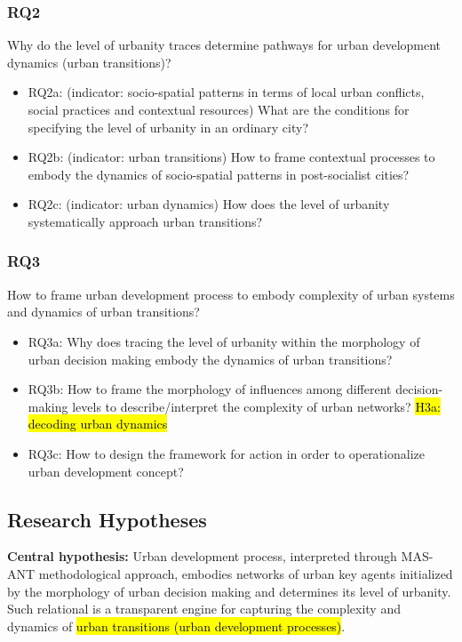 \documentclass[11pt]{report}
\begin{document}
\subsubsection{RQ2}
Why do the level of urbanity traces determine pathways for urban development dynamics (urban transitions)? 
\begin{itemize}
\item RQ2a: (indicator: socio-spatial patterns in terms of local urban conflicts, social practices and contextual resources) What are the conditions for specifying the level of urbanity in an ordinary city?
\item RQ2b: (indicator:  urban transitions) How to frame contextual processes to embody the dynamics of socio-spatial patterns in post-socialist cities?
\item RQ2c: (indicator: urban dynamics) How does the level of urbanity systematically approach urban transitions?
\end {itemize}

\subsubsection{RQ3}
How to frame urban development process to embody complexity of urban systems and dynamics of urban transitions?
\begin{itemize}
\item RQ3a: Why does tracing the level of urbanity within the morphology of urban decision making embody the dynamics of urban transitions?
\item RQ3b: How to frame the morphology of influences among different decision-making levels to describe/interpret the complexity of urban networks?  \hl{H3a: decoding urban dynamics}
\item RQ3c: How to design the framework for action in order to operationalize urban development concept?
\end {itemize}

\subsection{Research Hypotheses}
\textbf{Central hypothesis:} Urban development process, interpreted through MAS-ANT methodological approach, embodies networks of urban key agents initialized by the morphology of urban decision making and determines its level of urbanity.
Such relational   is a transparent engine for capturing the complexity and dynamics of \hl{urban transitions (urban development processes)}. 
\end{document}
